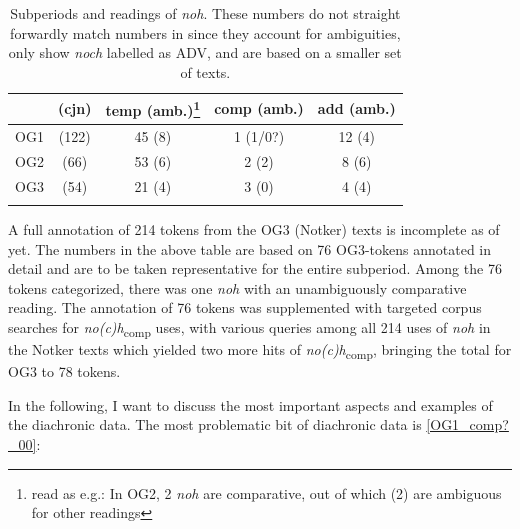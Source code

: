 \documentclass[output=paper,
modfonts
]{langscibook}
\begin{document}
\begin{table}
\begin{tabular}{lcccc}
\lsptoprule
	& (cjn) & temp (amb.)\footnote{read as e.g.: In OG2, 2 \textit{noh} are comparative, out of which (2) are ambiguous for other readings}& comp (amb.)	& add (amb.)	\\
\midrule
OG1		& (122) & 45 (8)    & 1 (1/0?)  & 12 (4)    \\ 
OG2		& (66)  & 53 (6)    & 2 (2)     & 8 (6)     \\
OG3		& (54)  & 21 (4)    & 3 (0)     & 4 (4)     \\
\lspbottomrule
\end{tabular}
\caption{Subperiods and readings of \textit{noh}. These numbers do not straight forwardly match numbers in  since they account for ambiguities, only show \textit{noch} labelled as ADV, and are based on a smaller set of texts.}
\label{tab:subperiods_and_readings}
\end{table}

\noindent A full annotation of 214 tokens from the OG3 (Notker) texts is incomplete as of yet. The numbers in the above table are based on 76 OG3-tokens annotated in detail and are to be taken representative for the entire subperiod. Among the 76 tokens categorized, there was one \textit{noh} with an unambiguously comparative reading. The annotation of 76 tokens was supplemented with targeted corpus searches for \textit{no(c)h}\textsubscript{comp} uses, with various queries among all 214 uses of \textit{noh} in the Notker texts which yielded two more hits of \textit{no(c)h}\textsubscript{comp}, bringing the total for OG3 to 78 tokens.

In the following, I want to discuss the most important aspects and examples of the diachronic data. The most problematic bit of diachronic data is \ref{OG1_comp?_00}:
\end{document}
